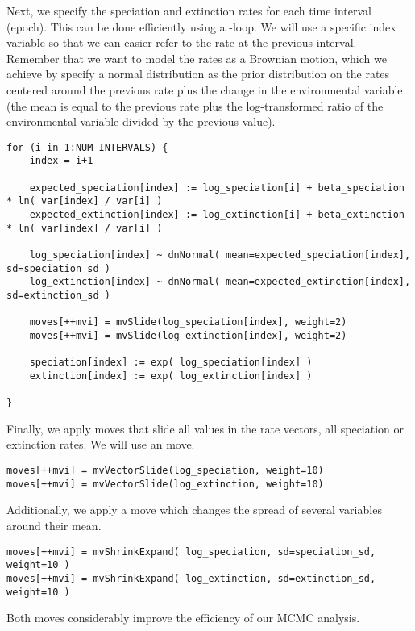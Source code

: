 Next, we specify the speciation and extinction rates for each time interval (\IE epoch).
This can be done efficiently using a -loop.
We will use a specific index variable so that we can easier refer to the rate at the previous interval.
Remember that we want to model the rates as a Brownian motion, which we achieve by specify a normal distribution as the prior distribution on the rates centered around the previous rate plus the change in the environmental variable (\IE the mean is equal to the previous rate plus the log-transformed ratio of the environmental variable divided by the previous value).
{\tt \begin{snugshade*}
\begin{lstlisting}
for (i in 1:NUM_INTERVALS) {
    index = i+1
    
    expected_speciation[index] := log_speciation[i] + beta_speciation * ln( var[index] / var[i] )
    expected_extinction[index] := log_extinction[i] + beta_extinction * ln( var[index] / var[i] )
    
    log_speciation[index] ~ dnNormal( mean=expected_speciation[index], sd=speciation_sd )
    log_extinction[index] ~ dnNormal( mean=expected_extinction[index], sd=extinction_sd )

    moves[++mvi] = mvSlide(log_speciation[index], weight=2)
    moves[++mvi] = mvSlide(log_extinction[index], weight=2)

    speciation[index] := exp( log_speciation[index] )
    extinction[index] := exp( log_extinction[index] )

}
\end{lstlisting}
\end{snugshade*}}
Finally, we apply moves that slide all values in the rate vectors, \IE all speciation or extinction rates. 
We will use an  move.
{\tt \begin{snugshade*}
\begin{lstlisting}
moves[++mvi] = mvVectorSlide(log_speciation, weight=10)
moves[++mvi] = mvVectorSlide(log_extinction, weight=10)
\end{lstlisting}
\end{snugshade*}}

Additionally, we apply a  move which changes the spread of several variables around their mean.
{\tt \begin{snugshade*}
\begin{lstlisting}
moves[++mvi] = mvShrinkExpand( log_speciation, sd=speciation_sd, weight=10 )
moves[++mvi] = mvShrinkExpand( log_extinction, sd=extinction_sd, weight=10 )
\end{lstlisting}
\end{snugshade*}}
Both moves considerably improve the efficiency of our MCMC analysis.

